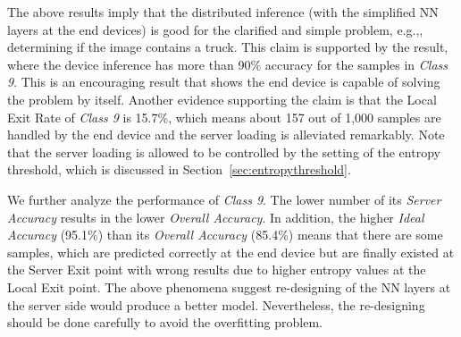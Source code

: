 \documentclass[format=acmsmall, review=false, screen=true]{acmart}
\def\sectionname{Section}
\begin{document}
The above results imply that the distributed inference (with the simplified NN layers at the end devices) is good for the clarified and simple problem, e.g.,, determining if the image contains a truck. This claim is supported by the result, where the device inference has more than 90\% accuracy for the samples in \emph{Class 9}. This is an encouraging result that shows the end device is capable of solving the problem by itself. Another evidence supporting the claim is that the Local Exit Rate of \emph{Class 9} is 15.7\%, which means about 157 out of 1,000 samples are handled by the end device and the server loading is alleviated remarkably. Note that the server loading is allowed to be controlled by the setting of the entropy threshold, which is discussed in \sectionname~\ref{sec:entropythreshold}.

We further analyze the performance of \emph{Class 9}. The lower number of its \emph{Server Accuracy} results in the lower \emph{Overall Accuracy}. In addition, the higher \emph{Ideal Accuracy} (95.1\%) than its \emph{Overall Accuracy} (85.4\%) means that there are some samples, which are predicted correctly at the end device but are finally existed at the Server Exit point with wrong results due to higher entropy values at the Local Exit point. The above phenomena suggest re-designing of the NN layers at the server side would produce a better model. Nevertheless, the re-designing should be done carefully to avoid the overfitting problem.
\end{document}
